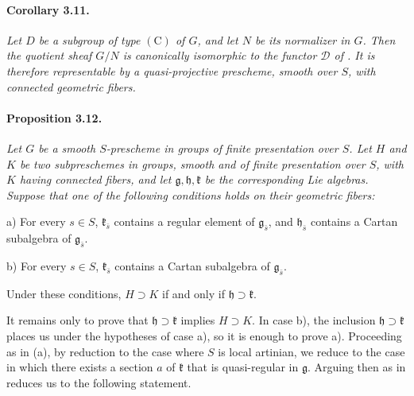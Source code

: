 \paragraph{\textbf{Corollary 3.11.}}
{\itshape Let \(D\) be a subgroup of type \((\mathrm C)\) of
\(G\), and let \(N\) be its normalizer in \(G\). Then the quotient
sheaf \(G/N\) is canonically isomorphic to the functor
\(\mathcal D\) of . It is therefore representable by a
quasi-projective prescheme, smooth over \(S\), with connected
geometric fibers.}



\paragraph{\textbf{Proposition 3.12.}}
{\itshape Let \(G\) be a smooth \(S\)-prescheme in groups of finite
presentation over \(S\). Let \(H\) and \(K\) be two subpreschemes
in groups, smooth and of finite presentation over \(S\), with
\(K\) having connected fibers, and let
\(\mathfrak g,\mathfrak h,\mathfrak k\) be the corresponding Lie
algebras. Suppose that one of the following conditions holds on
their geometric fibers:

\smallskip
\noindent
\textup{a)}
For every \(s\in S\), \(\mathfrak k_{\bar s}\) contains a regular
element of \(\mathfrak g_{\bar s}\), and
\(\mathfrak h_{\bar s}\) contains a Cartan subalgebra of
\(\mathfrak g_{\bar s}\).

\smallskip
\noindent
\textup{b)}
For every \(s\in S\), \(\mathfrak k_{\bar s}\) contains a Cartan
subalgebra of \(\mathfrak g_{\bar s}\).

\smallskip
\noindent
Under these conditions, \(H\supset K\) if and only if
\(\mathfrak h\supset\mathfrak k\).}

It remains only to prove that
\(\mathfrak h\supset\mathfrak k\) implies \(H\supset K\). In case
\textup{b)}, the inclusion
\(\mathfrak h\supset\mathfrak k\) places us under the hypotheses of
case \textup{a)}, so it is enough to prove \textup{a)}. Proceeding
as in \textup{(a)}, by reduction to the case where \(S\) is
local artinian, we reduce to the case in which there exists a
section \(a\) of \(\mathfrak k\) that is quasi-regular in
\(\mathfrak g\). Arguing then as in  reduces us to the
following statement.

